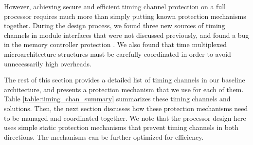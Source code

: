 
However, achieving secure and efficient timing channel protection on a full processor
requires much more than simply putting known protection mechanisms
together. During the design process, we found three new sources of timing channels
in module interfaces that were not discussed previously, and found a bug in the
memory controller protection \cite{ushpca14}.
We also found that time multiplexed
microarchitecture structures must be carefully coordinated in order to avoid 
unnecessarily high overheads. 

The rest of this section provides a detailed list of timing channels in our
baseline architecture, and presents a protection mechanism that we use for each of them.
Table \ref{table:timing_chan_summary} summarizes these timing channels and
solutions. 
Then, the next section discusses how these protection mechanisms
need to be managed and coordinated together.
We note that the processor design here uses simple static protection
mechanisms that prevent timing channels in both directions. The mechanisms 
can be further optimized for efficiency.

